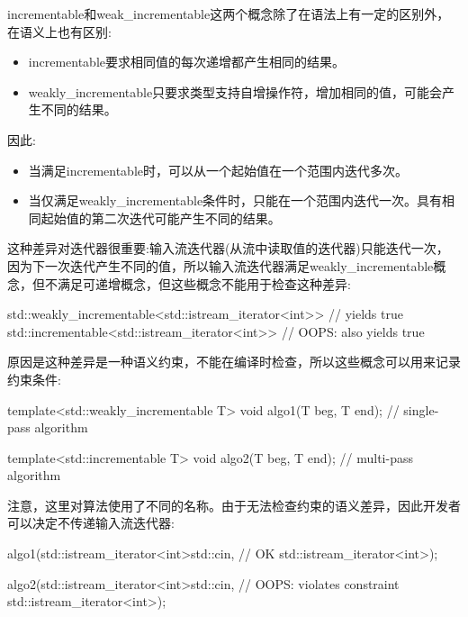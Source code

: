 
incrementable和weak\_incrementable这两个概念除了在语法上有一定的区别外，在语义上也有区别:

\begin{itemize}
\item
incrementable要求相同值的每次递增都产生相同的结果。

\item
weakly\_incrementable只要求类型支持自增操作符，增加相同的值，可能会产生不同的结果。
\end{itemize}

因此:

\begin{itemize}
\item
当满足incrementable时，可以从一个起始值在一个范围内迭代多次。

\item
当仅满足weakly\_incrementable条件时，只能在一个范围内迭代一次。具有相同起始值的第二次迭代可能产生不同的结果。
\end{itemize}

这种差异对迭代器很重要:输入流迭代器(从流中读取值的迭代器)只能迭代一次，因为下一次迭代产生不同的值，所以输入流迭代器满足weakly\_incrementable概念，但不满足可递增概念，但这些概念不能用于检查这种差异:

\begin{cpp}
std::weakly_incrementable<std::istream_iterator<int>> // yields true
std::incrementable<std::istream_iterator<int>> // OOPS: also yields true
\end{cpp}

原因是这种差异是一种语义约束，不能在编译时检查，所以这些概念可以用来记录约束条件:

\begin{cpp}
template<std::weakly_incrementable T>
void algo1(T beg, T end); // single-pass algorithm

template<std::incrementable T>
void algo2(T beg, T end); // multi-pass algorithm
\end{cpp}

注意，这里对算法使用了不同的名称。由于无法检查约束的语义差异，因此开发者可以决定不传递输入流迭代器:

\begin{cpp}
algo1(std::istream_iterator<int>{std::cin}, // OK
	  std::istream_iterator<int>{});

algo2(std::istream_iterator<int>{std::cin}, // OOPS: violates constraint
	  std::istream_iterator<int>{});
\end{cpp}

